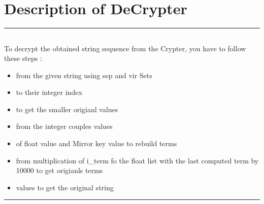 \documentclass[letterpaper,10pt,english]{sphinxmanual}
\begin{document}
\newpage
\section{Description of De\sphinxhyphen{}Crypter}
\label{\detokenize{DescriptionofAltDecrypterv2:description-of-de-crypter}}\label{\detokenize{DescriptionofAltDecrypterv2::doc}}
\sphinxAtStartPar
{}


\bigskip\hrule\bigskip



\subsection{}
\label{\detokenize{DescriptionofAltDecrypterv2:algorithm}}
\sphinxAtStartPar
To decrypt the obtained string sequence from the Crypter, you have to follow these steps :
\begin{itemize}
\item {} 
\sphinxAtStartPar
{} from the given string using sep and vir Sets

\item {} 
\sphinxAtStartPar
{} to their integer index

\item {} 
\sphinxAtStartPar
{} to get the smaller origianl values

\item {} 
\sphinxAtStartPar
{} from the integer couples values

\item {} 
\sphinxAtStartPar
{} of float value and Mirror key value to rebuild terms

\item {} 
\sphinxAtStartPar
{} from multiplication of i\_term fo the float list with the last computed term by 10000 to get origianls terms

\item {} 
\sphinxAtStartPar
{} values to get the original string

\end{itemize}


\bigskip\hrule\bigskip
\end{document}
